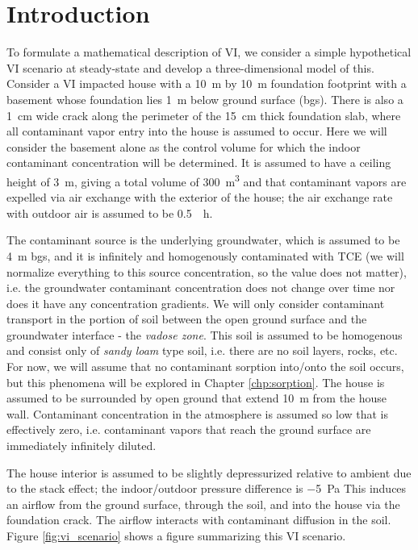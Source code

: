 \section{Introduction}

To formulate a mathematical description of VI, we consider a simple hypothetical VI scenario at steady-state and develop a three-dimensional model of this.
Consider a VI impacted house with a \SI{10}{\metre} by \SI{10}{\metre} foundation footprint with a basement whose foundation lies \SI{1}{\metre} below ground surface (bgs).
There is also a \SI{1}{\centi\metre} wide crack along the perimeter of the \SI{15}{\centi\metre} thick foundation slab, where all contaminant vapor entry into the house is assumed to occur.
Here we will consider the basement alone as the control volume for which the indoor contaminant concentration will be determined.
It is assumed to have a ceiling height of \SI{3}{\metre}, giving a total volume of \SI{300}{\metre\cubed}
and that contaminant vapors are expelled via air exchange with the exterior of the house; the air exchange rate with outdoor air is assumed to be \SI{0.5}{\per\hour}.\par

The contaminant source is the underlying groundwater, which is assumed to be \SI{4}{\metre} bgs, and it is infinitely and homogenously contaminated with TCE (we will normalize everything to this source concentration, so the value does not matter), i.e. the groundwater contaminant concentration does not change over time nor does it have any concentration gradients.
We will only consider contaminant transport in the portion of soil between the open ground surface and the groundwater interface - the \textit{vadose zone}.
This soil is assumed to be homogenous and consist only of \textit{sandy loam} type soil, i.e. there are no soil layers, rocks, etc.
For now, we will assume that no contaminant sorption into/onto the soil occurs, but this phenomena will be explored in Chapter \ref{chp:sorption}.
The house is assumed to be surrounded by open ground that extend \SI{10}{\metre} from the house wall.
Contaminant concentration in the atmosphere is assumed so low that is effectively zero, i.e. contaminant vapors that reach the ground surface are immediately infinitely diluted. \par

The house interior is assumed to be slightly depressurized relative to ambient due to the stack effect; the indoor/outdoor pressure difference is \SI{-5}{\pascal}
This induces an airflow from the ground surface, through the soil, and into the house via the foundation crack.
The airflow interacts with contaminant diffusion in the soil.
Figure \ref{fig:vi_scenario} shows a figure summarizing this VI scenario.\par

